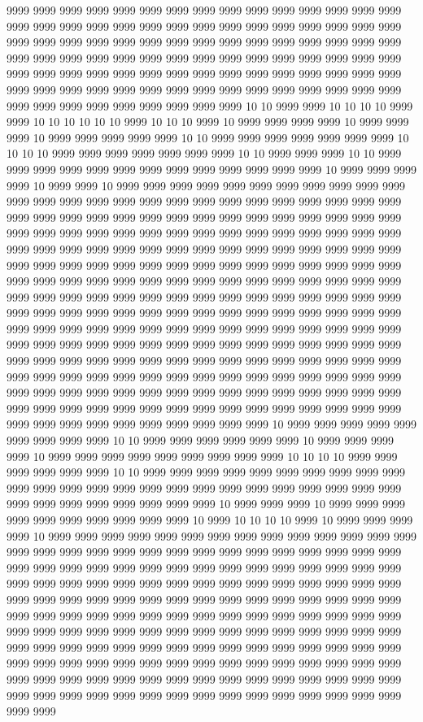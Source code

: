 9999 9999 9999 9999 9999 9999 9999 9999 9999 9999 9999 9999 9999 9999 9999 9999 9999 9999 9999 9999 9999 9999 9999 9999 9999 9999 9999 9999 9999 9999 9999 9999 9999 9999 9999 9999 9999 9999 9999 9999 9999 9999 9999 9999 9999 9999 9999 9999 9999 9999 9999 9999 9999 9999 9999 9999 9999 9999 9999 9999 9999 9999 9999 9999 9999 9999 9999 9999 9999 9999 9999 9999 9999 9999 9999 9999 9999 9999 9999 9999 9999 9999 9999 9999 9999 9999 9999 9999 9999 9999 9999 9999 9999 9999 9999 9999 9999 9999 9999 10 10 9999 9999 10 10 10 10 9999 9999 10 10 10 10 10 10 9999 10 10 10 9999 10 9999 9999 9999 9999 10 9999 9999 9999 10 9999 9999 9999 9999 9999 10 10 9999 9999 9999 9999 9999 9999 9999 10 10 10 10 9999 9999 9999 9999 9999 9999 9999 10 10 9999 9999 9999 10 10 9999 9999 9999 9999 9999 9999 9999 9999 9999 9999 9999 9999 9999 10 9999 9999 9999 9999 10 9999 9999 10 9999 9999 9999 9999 9999 9999 9999 9999 9999 9999 9999 9999 9999 9999 9999 9999 9999 9999 9999 9999 9999 9999 9999 9999 9999 9999 9999 9999 9999 9999 9999 9999 9999 9999 9999 9999 9999 9999 9999 9999 9999 9999 9999 9999 9999 9999 9999 9999 9999 9999 9999 9999 9999 9999 9999 9999 9999 9999 9999 9999 9999 9999 9999 9999 9999 9999 9999 9999 9999 9999 9999 9999 9999 9999 9999 9999 9999 9999 9999 9999 9999 9999 9999 9999 9999 9999 9999 9999 9999 9999 9999 9999 9999 9999 9999 9999 9999 9999 9999 9999 9999 9999 9999 9999 9999 9999 9999 9999 9999 9999 9999 9999 9999 9999 9999 9999 9999 9999 9999 9999 9999 9999 9999 9999 9999 9999 9999 9999 9999 9999 9999 9999 9999 9999 9999 9999 9999 9999 9999 9999 9999 9999 9999 9999 9999 9999 9999 9999 9999 9999 9999 9999 9999 9999 9999 9999 9999 9999 9999 9999 9999 9999 9999 9999 9999 9999 9999 9999 9999 9999 9999 9999 9999 9999 9999 9999 9999 9999 9999 9999 9999 9999 9999 9999 9999 9999 9999 9999 9999 9999 9999 9999 9999 9999 9999 9999 9999 9999 9999 9999 9999 9999 9999 9999 9999 9999 9999 9999 9999 9999 9999 9999 9999 9999 9999 9999 9999 9999 9999 9999 9999 9999 9999 9999 9999 9999 9999 9999 9999 9999 9999 10 9999 9999 9999 9999 9999 9999 9999 9999 9999 10 10 9999 9999 9999 9999 9999 9999 10 9999 9999 9999 9999 10 9999 9999 9999 9999 9999 9999 9999 9999 9999 10 10 10 10 9999 9999 9999 9999 9999 9999 10 10 9999 9999 9999 9999 9999 9999 9999 9999 9999 9999 9999 9999 9999 9999 9999 9999 9999 9999 9999 9999 9999 9999 9999 9999 9999 9999 9999 9999 9999 9999 9999 9999 9999 10 9999 9999 9999 10 9999 9999 9999 9999 9999 9999 9999 9999 9999 9999 10 9999 10 10 10 10 9999 10 9999 9999 9999 9999 10 9999 9999 9999 9999 9999 9999 9999 9999 9999 9999 9999 9999 9999 9999 9999 9999 9999 9999 9999 9999 9999 9999 9999 9999 9999 9999 9999 9999 9999 9999 9999 9999 9999 9999 9999 9999 9999 9999 9999 9999 9999 9999 9999 9999 9999 9999 9999 9999 9999 9999 9999 9999 9999 9999 9999 9999 9999 9999 9999 9999 9999 9999 9999 9999 9999 9999 9999 9999 9999 9999 9999 9999 9999 9999 9999 9999 9999 9999 9999 9999 9999 9999 9999 9999 9999 9999 9999 9999 9999 9999 9999 9999 9999 9999 9999 9999 9999 9999 9999 9999 9999 9999 9999 9999 9999 9999 9999 9999 9999 9999 9999 9999 9999 9999 9999 9999 9999 9999 9999 9999 9999 9999 9999 9999 9999 9999 9999 9999 9999 9999 9999 9999 9999 9999 9999 9999 9999 9999 9999 9999 9999 9999 9999 9999 9999 9999 9999 9999 9999 9999 9999 9999 9999 9999 9999 9999 9999 9999 9999 9999 9999 9999 9999 9999 9999 9999 